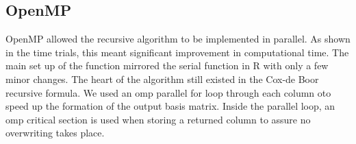 



\subsection{OpenMP} %
OpenMP allowed the recursive algorithm to be implemented in parallel. As shown in the
time trials, this meant significant improvement in computational time. The main set up of the
function mirrored the serial function in R with only a few minor changes. The heart of the algorithm still
existed in the Cox-de Boor recursive formula. We used an omp parallel for loop through each column oto speed up the formation of the output basis matrix. Inside the parallel loop, an omp critical section is used when storing a returned column to assure no overwriting takes place.


